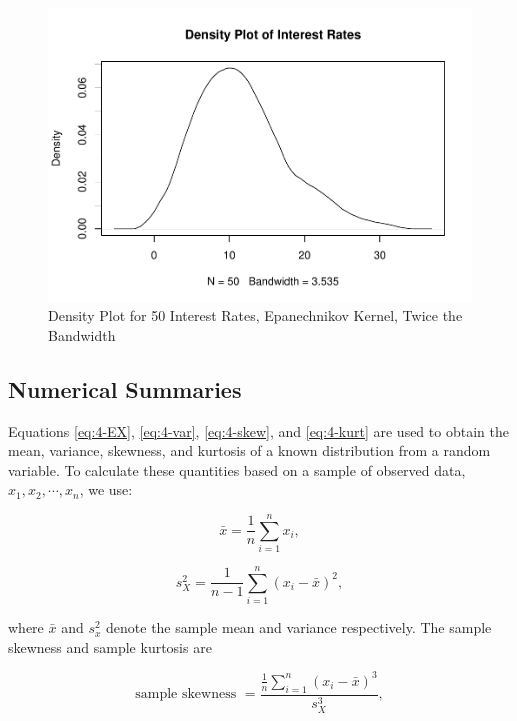 \documentclass[
]{book}
\begin{document}
\begin{figure}
\centering
\includegraphics{bookdown-demo_files/figure-latex/4-R2-1.pdf}
\caption{\label{fig:4-R2}Density Plot for 50 Interest Rates, Epanechnikov Kernel, Twice the Bandwidth}
\end{figure}

\subsection{Numerical Summaries}\label{numerical-summaries}

Equations \eqref{eq:4-EX}, \eqref{eq:4-var}, \eqref{eq:4-skew}, and \eqref{eq:4-kurt} are used to obtain the mean, variance, skewness, and kurtosis of a known distribution from a random variable. To calculate these quantities based on a sample of observed data, \(x_1, x_2, \cdots, x_n\), we use:

\begin{equation} 
\bar{x} =  \frac{1}{n} \sum_{i=1}^n x_i,
\label{eq:4-xbar}
\end{equation}

\begin{equation} 
s_X^2 =  \frac{1}{n-1} \sum_{i=1}^n (x_i - \bar{x})^2,
\label{eq:4-sampvar}
\end{equation}

where \(\bar{x}\) and \(s_x^2\) denote the sample mean and variance respectively. The sample skewness and sample kurtosis are

\begin{equation} 
\text{sample skewness } =  \frac{\frac{1}{n} \sum_{i=1}^n (x_i - \bar{x})^3}{s_X^3},
\label{eq:4-sampskew}
\end{equation}
\end{document}

